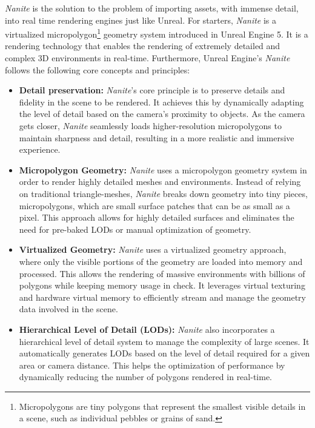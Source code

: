 \documentclass[10pt,journal,compsoc]{IEEEtran}
\begin{document}
    \textit{Nanite} is the solution to the problem of importing assets, with immense detail, into real time rendering engines just like Unreal. For starters, \textit{Nanite} is a virtualized micropolygon\footnote{ Micropolygons are tiny polygons that represent the smallest visible details in a scene, such as individual pebbles or grains of sand.} geometry system introduced in Unreal Engine 5. It is a rendering technology that enables the rendering of extremely detailed and complex 3D environments in real-time. Furthermore, Unreal Engine's \textit{Nanite} follows the following core concepts and principles:

    \begin{itemize}
    
         \item \textbf{Detail preservation:} \textit{Nanite}'s core principle is to preserve details and fidelity in the scene to be rendered. It achieves this by dynamically adapting the level of detail based on the camera's proximity to objects. As the camera gets closer, \textit{Nanite} seamlessly loads higher-resolution micropolygons to maintain sharpness and detail, resulting in a more realistic and immersive experience.
        
        \item \textbf{Micropolygon Geometry:} \textit{Nanite} uses a micropolygon geometry system in order to render highly detailed meshes and environments. Instead of relying on traditional triangle-meshes, \textit{Nanite} breaks down geometry into tiny pieces, micropolygons, which are small surface patches that can be as small as a pixel. This approach allows for highly detailed surfaces and eliminates the need for pre-baked LODs or manual optimization of geometry.

        \item \textbf{Virtualized Geometry:} \textit{Nanite} uses a virtualized geometry approach, where only the visible portions of the geometry are loaded into memory and processed. This allows the rendering of massive environments with billions of polygons while keeping memory usage in check. It leverages virtual texturing and hardware virtual memory to efficiently stream and manage the geometry data involved in the scene.
        
        \item \textbf{Hierarchical Level of Detail (LODs):} \textit{Nanite} also incorporates a hierarchical level of detail system to manage the complexity of large scenes. It automatically generates LODs based on the level of detail required for a given area or camera distance. This helps the optimization of performance by dynamically reducing the number of polygons rendered in real-time.
        

\end{itemize}
\end{document}
